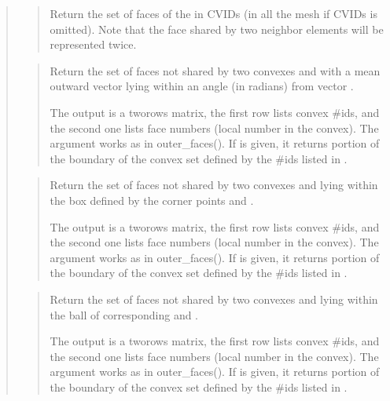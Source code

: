 \documentclass[a4paper,11pt,english]{sphinxmanual}
\begin{document}
\begin{quote}
\begin{quote}
Return the set of faces of the in CVIDs (in all the mesh if CVIDs is
omitted). Note that the face shared by two neighbor elements will be
represented twice.
\end{quote}

\begin{quote}

Return the set of faces not shared by two convexes and with a mean outward vector lying within an angle  (in radians) from vector .

The output  is a two\sphinxhyphen{}rows matrix, the first row lists convex
\#ids, and the second one lists face numbers (local number in the
convex). The argument  works as in outer\_faces().
If  is given, it returns portion of the boundary of
the convex set defined by the \#ids listed in .
\end{quote}

\begin{quote}

Return the set of faces not shared by two convexes and lying within the box defined by the corner points  and .

The output  is a two\sphinxhyphen{}rows matrix, the first row lists convex
\#ids, and the second one lists face numbers (local number in the
convex). The argument  works as in outer\_faces().
If  is given, it returns portion of the boundary of
the convex set defined by the \#ids listed in .
\end{quote}

\begin{quote}

Return the set of faces not shared by two convexes and lying within the ball of corresponding  and .

The output  is a two\sphinxhyphen{}rows matrix, the first row lists convex
\#ids, and the second one lists face numbers (local number in the
convex). The argument  works as in outer\_faces().
If  is given, it returns portion of the boundary of
the convex set defined by the \#ids listed in .
\end{quote}


\end{quote}
\end{document}
